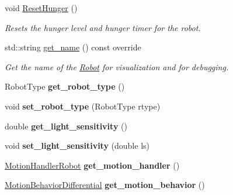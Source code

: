 \begin{DoxyCompactItemize}
\item 
void \hyperlink{classRobot_aa90f9fd3d9194c2456e33c98c7d6f538}{Reset\+Hunger} ()\hypertarget{classRobot_aa90f9fd3d9194c2456e33c98c7d6f538}{}\label{classRobot_aa90f9fd3d9194c2456e33c98c7d6f538}

\begin{DoxyCompactList}\small\item\em Resets the hunger level and hunger timer for the robot. \end{DoxyCompactList}\item 
std\+::string \hyperlink{classRobot_a3f77c13705b8f60480d21d8d936dc39e}{get\+\_\+name} () const override\hypertarget{classRobot_a3f77c13705b8f60480d21d8d936dc39e}{}\label{classRobot_a3f77c13705b8f60480d21d8d936dc39e}

\begin{DoxyCompactList}\small\item\em Get the name of the \hyperlink{classRobot}{Robot} for visualization and for debugging. \end{DoxyCompactList}\item 
Robot\+Type {\bfseries get\+\_\+robot\+\_\+type} ()\hypertarget{classRobot_a1463b5699ff9a30a76768f7570b43b0d}{}\label{classRobot_a1463b5699ff9a30a76768f7570b43b0d}

\item 
void {\bfseries set\+\_\+robot\+\_\+type} (Robot\+Type rtype)\hypertarget{classRobot_ab61b7ecbd5276cefb50844f619aeba7e}{}\label{classRobot_ab61b7ecbd5276cefb50844f619aeba7e}

\item 
double {\bfseries get\+\_\+light\+\_\+sensitivity} ()\hypertarget{classRobot_a2aa27656e640dc3daa72d9d0ead767e0}{}\label{classRobot_a2aa27656e640dc3daa72d9d0ead767e0}

\item 
void {\bfseries set\+\_\+light\+\_\+sensitivity} (double ls)\hypertarget{classRobot_a965ac6da12ae588bc4d4c2e6887cc088}{}\label{classRobot_a965ac6da12ae588bc4d4c2e6887cc088}

\item 
\hyperlink{classMotionHandlerRobot}{Motion\+Handler\+Robot} {\bfseries get\+\_\+motion\+\_\+handler} ()\hypertarget{classRobot_a77d37cf0058d18b7f633202e8c1bf814}{}\label{classRobot_a77d37cf0058d18b7f633202e8c1bf814}

\item 
\hyperlink{classMotionBehaviorDifferential}{Motion\+Behavior\+Differential} {\bfseries get\+\_\+motion\+\_\+behavior} ()\hypertarget{classRobot_ab45bf3c6fdafcd14cdbdb2a8e3f558b8}{}\label{classRobot_ab45bf3c6fdafcd14cdbdb2a8e3f558b8}


\end{DoxyCompactItemize}
